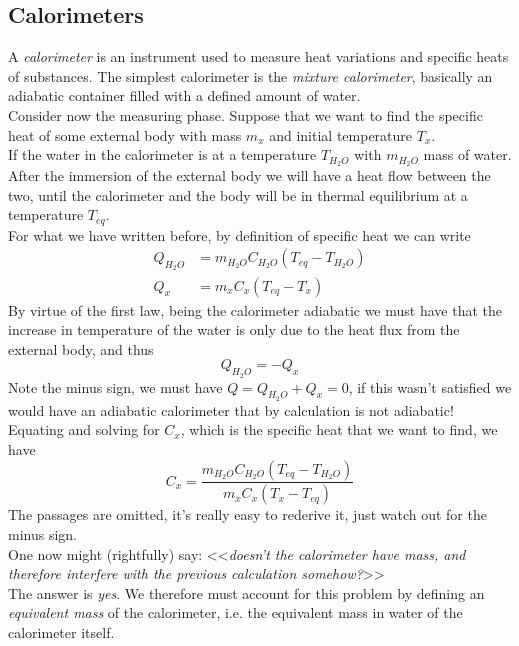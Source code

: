 \documentclass[../qm.tex]{subfiles}
\begin{document}
\subsection{Calorimeters}
A \textit{calorimeter} is an instrument used to measure heat variations and specific heats of substances. The simplest calorimeter is the \textit{mixture calorimeter}, basically an adiabatic container filled with a defined amount of water.\\
Consider now the measuring phase. Suppose that we want to find the specific heat of some external body with mass $m_x$ and initial temperature $T_x$.\\
If the water in the calorimeter is at a temperature $T_{H_2O}$ with $m_{H_2O}$ mass of water. After the immersion of the external body we will have a heat flow between the two, until the calorimeter and the body will be in thermal equilibrium at a temperature $T_{eq}$.\\
For what we have written before, by definition of specific heat we can write
\begin{equation}
	\begin{aligned}
		Q_{H_2O}&= m_{H_2O}C_{H_2O}\left( T_{eq}-T_{H_2O} \right)\\
		Q_x&= m_xC_x\left( T_{eq}-T_{x} \right)
	\end{aligned}
	\label{eq:shmeasure.cal}
\end{equation}
By virtue of the first law, being the calorimeter adiabatic we must have that the increase in temperature of the water is only due to the heat flux from the external body, and thus 
\begin{equation*}
	Q_{H_2O}=-Q_x
\end{equation*}
Note the minus sign, we must have $Q=Q_{H_2O}+Q_x=0$, if this wasn't satisfied we would have an adiabatic calorimeter that by calculation is not adiabatic!\\
Equating and solving for $C_x$, which is the specific heat that we want to find, we have
\begin{equation}
	C_x=\frac{m_{H_2O}C_{H_2O}\left( T_{eq}-T_{H_2O} \right)}{m_xC_x\left( T_x-T_{eq} \right)}
	\label{eq:sheat.cal}
\end{equation}
The passages are omitted, it's really easy to rederive it, just watch out for the minus sign.\\
One now might (rightfully) say: <<\textit{doesn't the calorimeter have mass, and therefore interfere with the previous calculation somehow?}>>\\
The answer is \textit{yes}. We therefore must account for this problem by defining an \emph{equivalent mass} of the calorimeter, i.e. the equivalent mass in water of the calorimeter itself.\\
\end{document}
